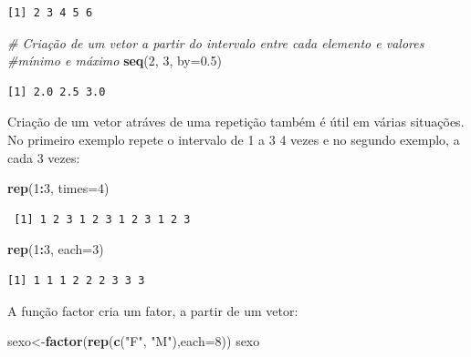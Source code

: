 \documentclass[12pt,brazil,oneside]{book}
\newenvironment{Shaded}{\begin{snugshade}}{\end{snugshade}}
\newcommand{\CommentTok}[1]{\textcolor[rgb]{0.56,0.35,0.01}{\textit{#1}}}
\newcommand{\DataTypeTok}[1]{\textcolor[rgb]{0.13,0.29,0.53}{#1}}
\newcommand{\DecValTok}[1]{\textcolor[rgb]{0.00,0.00,0.81}{#1}}
\newcommand{\FloatTok}[1]{\textcolor[rgb]{0.00,0.00,0.81}{#1}}
\newcommand{\KeywordTok}[1]{\textcolor[rgb]{0.13,0.29,0.53}{\textbf{#1}}}
\newcommand{\NormalTok}[1]{#1}
\newcommand{\OperatorTok}[1]{\textcolor[rgb]{0.81,0.36,0.00}{\textbf{#1}}}
\newcommand{\StringTok}[1]{\textcolor[rgb]{0.31,0.60,0.02}{#1}}
\begin{document}
\begin{verbatim}
[1] 2 3 4 5 6
\end{verbatim}

\begin{Shaded}
\begin{Highlighting}[]
\CommentTok{# Criação de um vetor a partir do intervalo entre cada elemento e valores}
\CommentTok{#mínimo e máximo}
\KeywordTok{seq}\NormalTok{(}\DecValTok{2}\NormalTok{, }\DecValTok{3}\NormalTok{, }\DataTypeTok{by=}\FloatTok{0.5}\NormalTok{)}
\end{Highlighting}
\end{Shaded}

\begin{verbatim}
[1] 2.0 2.5 3.0
\end{verbatim}

Criação de um vetor atráves de uma repetição também é útil em várias situações. No primeiro exemplo repete o intervalo de 1 a 3 4 vezes e no segundo exemplo, a cada 3 vezes:

\begin{Shaded}
\begin{Highlighting}[]
\KeywordTok{rep}\NormalTok{(}\DecValTok{1}\OperatorTok{:}\DecValTok{3}\NormalTok{, }\DataTypeTok{times=}\DecValTok{4}\NormalTok{)}
\end{Highlighting}
\end{Shaded}

\begin{verbatim}
 [1] 1 2 3 1 2 3 1 2 3 1 2 3
\end{verbatim}

\begin{Shaded}
\begin{Highlighting}[]
\KeywordTok{rep}\NormalTok{(}\DecValTok{1}\OperatorTok{:}\DecValTok{3}\NormalTok{, }\DataTypeTok{each=}\DecValTok{3}\NormalTok{)}
\end{Highlighting}
\end{Shaded}

\begin{verbatim}
[1] 1 1 1 2 2 2 3 3 3
\end{verbatim}

A função factor cria um fator, a partir de um vetor:

\begin{Shaded}
\begin{Highlighting}[]
\NormalTok{sexo<-}\KeywordTok{factor}\NormalTok{(}\KeywordTok{rep}\NormalTok{(}\KeywordTok{c}\NormalTok{(}\StringTok{"F"}\NormalTok{, }\StringTok{"M"}\NormalTok{),}\DataTypeTok{each=}\DecValTok{8}\NormalTok{))}
\NormalTok{sexo}
\end{Highlighting}
\end{Shaded}
\end{document}

